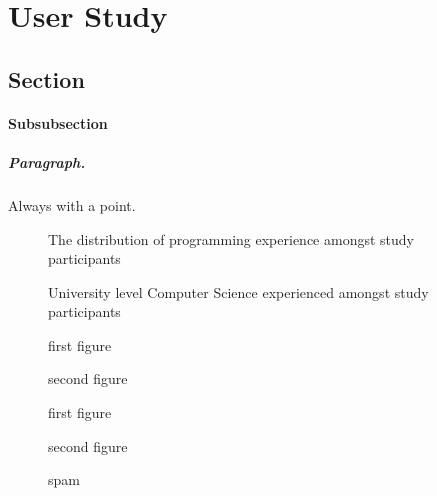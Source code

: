 \chapter{User Study}
\section{Section}
%
\subsubsection{Subsubsection}

\paragraph{Paragraph.} Always with a point.

\begin{figure}[H]
	\scalebox{0.75}{}
	\caption{The distribution of programming experience amongst study participants}
	\label{fig:programmingexp}
\end{figure}

\begin{figure}[H]
	\scalebox{1}{}
	\caption{University level Computer Science experienced amongst study participants}
	\label{fig:uniexp}
\end{figure}

\begin{figure}
	\centering
	\begin{minipage}{0.45\textwidth}
		\centering
		\scalebox{0.55}{}
		\caption{first figure}
	\end{minipage}\hfill
	\begin{minipage}{0.45\textwidth}
		\centering
		\scalebox{0.55}{}
		\caption{second figure}
	\end{minipage}
\end{figure}

\begin{figure}
	\centering
	\begin{minipage}{0.45\textwidth}
		\centering
		\scalebox{0.55}{}
		\caption{first figure}
	\end{minipage}\hfill
	\begin{minipage}{0.45\textwidth}
		\centering
		\scalebox{0.55}{}
		\caption{second figure}
	\end{minipage}
\end{figure}


\begin{figure}[H]
	\scalebox{1}{}
	\scalebox{0.8}{}
	\caption{spam}
	\label{fig:uniexp}
\end{figure}
